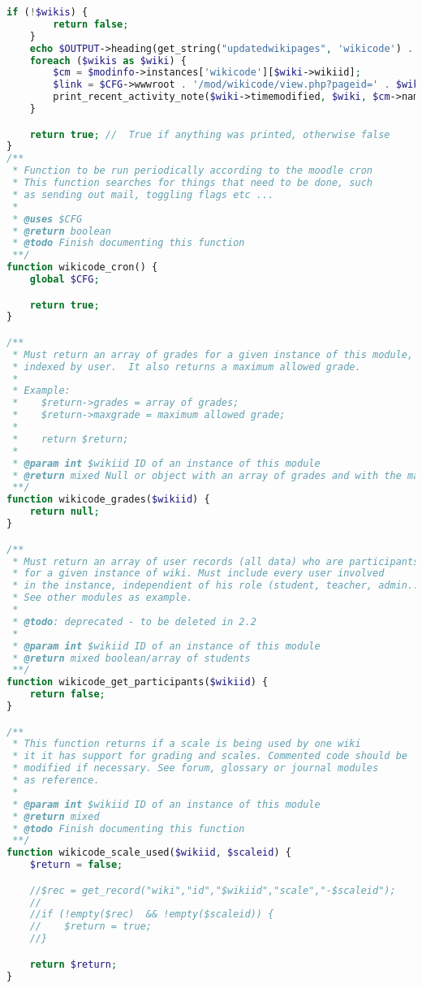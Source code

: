 \begin{lstlisting}[language=PHP]
    if (!$wikis) {
        return false;
    }
    echo $OUTPUT->heading(get_string("updatedwikipages", 'wikicode') . ':', 3);
    foreach ($wikis as $wiki) {
        $cm = $modinfo->instances['wikicode'][$wiki->wikiid];
        $link = $CFG->wwwroot . '/mod/wikicode/view.php?pageid=' . $wiki->id;
        print_recent_activity_note($wiki->timemodified, $wiki, $cm->name, $link, false, $viewfullnames);
    }

    return true; //  True if anything was printed, otherwise false
}
/**
 * Function to be run periodically according to the moodle cron
 * This function searches for things that need to be done, such
 * as sending out mail, toggling flags etc ...
 *
 * @uses $CFG
 * @return boolean
 * @todo Finish documenting this function
 **/
function wikicode_cron() {
    global $CFG;

    return true;
}

/**
 * Must return an array of grades for a given instance of this module,
 * indexed by user.  It also returns a maximum allowed grade.
 *
 * Example:
 *    $return->grades = array of grades;
 *    $return->maxgrade = maximum allowed grade;
 *
 *    return $return;
 *
 * @param int $wikiid ID of an instance of this module
 * @return mixed Null or object with an array of grades and with the maximum grade
 **/
function wikicode_grades($wikiid) {
    return null;
}

/**
 * Must return an array of user records (all data) who are participants
 * for a given instance of wiki. Must include every user involved
 * in the instance, independient of his role (student, teacher, admin...)
 * See other modules as example.
 *
 * @todo: deprecated - to be deleted in 2.2
 *
 * @param int $wikiid ID of an instance of this module
 * @return mixed boolean/array of students
 **/
function wikicode_get_participants($wikiid) {
    return false;
}

/**
 * This function returns if a scale is being used by one wiki
 * it it has support for grading and scales. Commented code should be
 * modified if necessary. See forum, glossary or journal modules
 * as reference.
 *
 * @param int $wikiid ID of an instance of this module
 * @return mixed
 * @todo Finish documenting this function
 **/
function wikicode_scale_used($wikiid, $scaleid) {
    $return = false;

    //$rec = get_record("wiki","id","$wikiid","scale","-$scaleid");
    //
    //if (!empty($rec)  && !empty($scaleid)) {
    //    $return = true;
    //}

    return $return;
}


\end{lstlisting}
